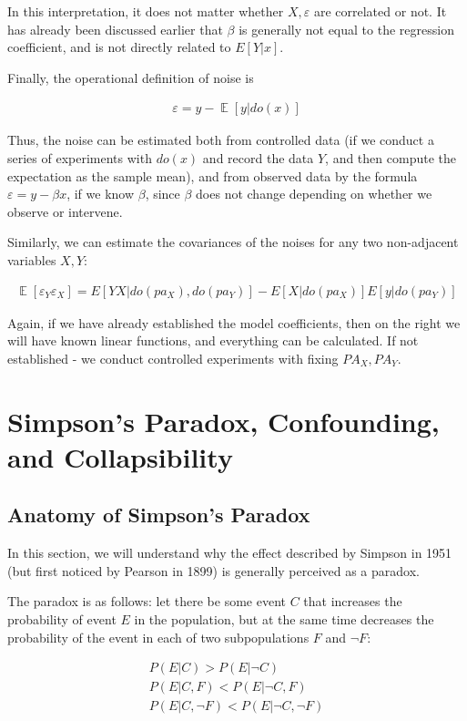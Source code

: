 \documentclass[fleqn]{article}
\DeclareMathOperator{\E}{\mathop\mathbb{E}}
\numberwithin{equation}{section}
\numberwithin{theorem}{section}
\numberwithin{figure}{section}
\numberwithin{lemma}{section}
\numberwithin{corollary}{section}
\begin{document}
In this interpretation, it does not matter whether $X,\varepsilon$ are correlated or not. It has already been discussed earlier that $\beta$ is generally not equal to the regression coefficient, and is not directly related to $E[Y|x]$.

Finally, the operational definition of noise is 

\begin{align}
	\varepsilon = y - \E[y|do(x)]
\end{align}

Thus, the noise can be estimated both from controlled data (if we conduct a series of experiments with $do(x)$ and record the data $Y$, and then compute the expectation as the sample mean), and from observed data by the formula $\varepsilon = y - \beta x$, if we know $\beta$, since $\beta$ does not change depending on whether we observe or intervene.

Similarly, we can estimate the covariances of the noises for any two non-adjacent variables $X,Y$:

\begin{align}
	\E[\varepsilon_Y\varepsilon_X] = E[YX|do(pa_X),do(pa_Y)] - E[X|do(pa_X)]E[y|do(pa_Y)]
\end{align}

Again, if we have already established the model coefficients, then on the right we will have known linear functions, and everything can be calculated. If not established - we conduct controlled experiments with fixing $PA_X,PA_Y$.

\section{Simpson's Paradox, Confounding, and Collapsibility}

\subsection*{Anatomy of Simpson's Paradox}

In this section, we will understand why the effect described by Simpson in 1951 (but first noticed by Pearson in 1899) is generally perceived as a paradox.

The paradox is as follows: let there be some event $C$ that increases the probability of event $E$ in the population, but at the same time decreases the probability of the event in each of two subpopulations $F$ and $\neg F$:

\begin{align}
	P(E|C) > P(E|\neg C) \label{eq:simpson1} \\
	P(E|C,F) < P(E|\neg C, F) \label{eq:simpson2} \\
	P(E|C,\neg F) < P(E| \neg C, \neg F) \label{eq:simpson3}
\end{align}
\end{document}
